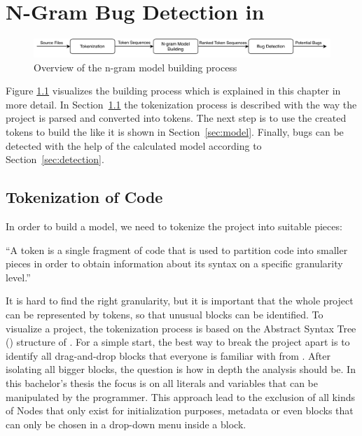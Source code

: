 \chapter{N-Gram Bug Detection in \scratch{}}\label{chap:methods}

\begin{figure}[hbtp]
\centering
\includegraphics[scale=0.75]{images/Overview.pdf}
\caption{Overview of the n-gram model building process}
\label{fig:overview}
\end{figure}

Figure \ref{fig:overview} visualizes the \ngram{} building process which is explained in this chapter in more detail. In Section~\ref{sec:tokenization} the tokenization process is described with the way the \scratch{} project is parsed and converted into tokens. The next step is to use the created tokens to build the \ngram{} like it is shown in Section~\ref{sec:model}. Finally, bugs can be detected with the help of the calculated model according to Section~\ref{sec:detection}.

\section{Tokenization of \scratch{} Code}\label{sec:tokenization}
In order to build a model, we need to tokenize the \scratch{} project into suitable pieces:

\begin{definition}[Token]\label{def:token}
    ``A token is a single fragment of \scratch{} code that is used to partition code into smaller pieces in order to obtain information about its syntax on a specific granularity level.''
\end{definition}

It is hard to find the right granularity, but it is important that the whole project can be represented by tokens, so that unusual blocks can be identified. To visualize a \scratch{} project, the tokenization process is based on the Abstract Syntax Tree (\AST{}) structure of \litterbox{}. 
For a simple start, the best way to break the project apart is to identify all drag-and-drop blocks that everyone is familiar with from \scratch{}. After isolating all bigger blocks, the question is how in depth the analysis should be. In this bachelor's thesis the focus is on all literals and variables that can be manipulated by the \scratch{} programmer. This approach lead to the exclusion of all kinds of \AST{}Nodes that only exist for initialization purposes, metadata or even blocks that can only be chosen in a drop-down menu inside a block.  

